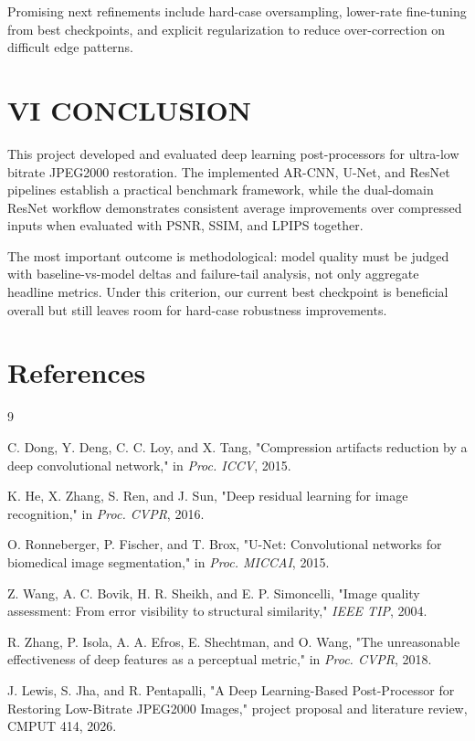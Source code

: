 \documentclass[12pt]{article}
\begin{document}
Promising next refinements include hard-case oversampling, lower-rate fine-tuning from best checkpoints, and explicit regularization to reduce over-correction on difficult edge patterns.

\section*{{\large VI}\small{ CONCLUSION}}

This project developed and evaluated deep learning post-processors for ultra-low bitrate JPEG2000 restoration. The implemented AR-CNN, U-Net, and ResNet pipelines establish a practical benchmark framework, while the dual-domain ResNet workflow demonstrates consistent average improvements over compressed inputs when evaluated with PSNR, SSIM, and LPIPS together.

The most important outcome is methodological: model quality must be judged with baseline-vs-model deltas and failure-tail analysis, not only aggregate headline metrics. Under this criterion, our current best checkpoint is beneficial overall but still leaves room for hard-case robustness improvements.

\section*{References}
\begin{thebibliography}{9}

C. Dong, Y. Deng, C. C. Loy, and X. Tang,
"Compression artifacts reduction by a deep convolutional network,"
in \textit{Proc. ICCV}, 2015.

K. He, X. Zhang, S. Ren, and J. Sun,
"Deep residual learning for image recognition,"
in \textit{Proc. CVPR}, 2016.

O. Ronneberger, P. Fischer, and T. Brox,
"U-Net: Convolutional networks for biomedical image segmentation,"
in \textit{Proc. MICCAI}, 2015.

Z. Wang, A. C. Bovik, H. R. Sheikh, and E. P. Simoncelli,
"Image quality assessment: From error visibility to structural similarity,"
\textit{IEEE TIP}, 2004.

R. Zhang, P. Isola, A. A. Efros, E. Shechtman, and O. Wang,
"The unreasonable effectiveness of deep features as a perceptual metric,"
in \textit{Proc. CVPR}, 2018.

J. Lewis, S. Jha, and R. Pentapalli,
"A Deep Learning-Based Post-Processor for Restoring Low-Bitrate JPEG2000 Images," project proposal and literature review, CMPUT 414, 2026.

\end{thebibliography}
\end{document}
